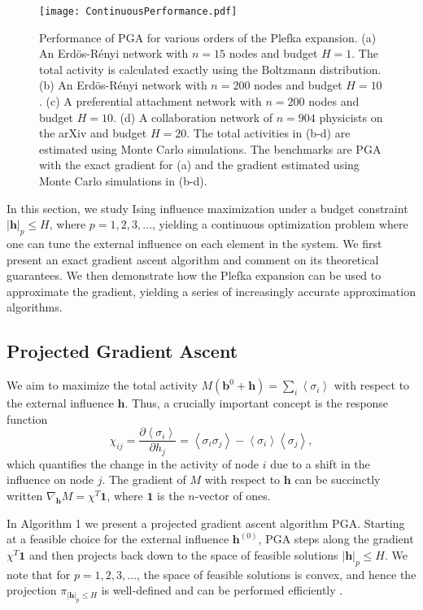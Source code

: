 \documentclass[letterpaper]{article} %
\begin{document}
\begin{figure*}
\texttt{[image: ContinuousPerformance.pdf]}
\caption{\label{continuous} Performance of PGA for various orders of the Plefka expansion. (a) An Erd\"{o}s-R\'{e}nyi network with $n=15$ nodes and budget $H=1$. The total activity is calculated exactly using the Boltzmann distribution. (b) An Erd\"{o}s-R\'{e}nyi network with $n=200$ nodes and budget $H=10$. (c) A preferential attachment network with $n=200$ nodes and budget $H=10$. (d) A collaboration network of $n=904$ physicists on the arXiv and budget $H=20$. The total activities in (b-d) are estimated using Monte Carlo simulations. The benchmarks are PGA with the exact gradient for (a) and the gradient estimated using Monte Carlo simulations in (b-d).}
\end{figure*}

In this section, we study Ising influence maximization under a budget constraint $|\bm{h}|_p\le H$, where $p=1,2,3,\hdots$, yielding a continuous optimization problem where one can tune the external influence on each element in the system. We first present an exact gradient ascent algorithm and comment on its theoretical guarantees. We then demonstrate how the Plefka expansion can be used to approximate the gradient, yielding a series of increasingly accurate approximation algorithms.

\subsection{Projected Gradient Ascent}

We aim to maximize the total activity $M(\bm{b}^0 + \bm{h}) = \sum_i\left<\sigma_i\right>$ with respect to the external influence $\bm{h}$. Thus, a crucially important concept is the response function
\begin{equation}
\chi_{ij} = \frac{\partial \left<\sigma_i\right>}{\partial h_j} = \left<\sigma_i\sigma_j\right> - \left<\sigma_i\right>\left<\sigma_j\right>,
\end{equation}
which quantifies the change in the activity of node $i$ due to a shift in the influence on node $j$. The gradient of $M$ with respect to $\bm{h}$ can be succinctly written $\nabla_{\bm{h}}M = \chi^T\bm{1}$, where $\bm{1}$ is the $n$-vector of ones.

In Algorithm 1 we present a projected gradient ascent algorithm PGA. Starting at a feasible choice for the external influence $\bm{h}^{(0)}$, PGA steps along the gradient $\chi^T\bm{1}$ and then projects back down to the space of feasible solutions $|\bm{h}|_p\le H$. We note that for $p=1,2,3,\hdots$, the space of feasible solutions is convex, and hence the projection $\pi_{|\bm{h}|_p\le H}$ is well-defined and can be performed efficiently \cite{Duchi-01}.
\end{document}

